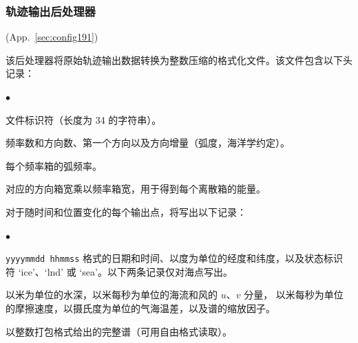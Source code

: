 \vsssub
\subsubsection{轨迹输出后处理器} \label{sec:ww3trck}
\vsssub

 (App.~\ref{sec:config191})

\vspace{\baselineskip}
\noindent
该后处理器将原始轨迹输出数据转换为整数压缩的格式化文件。该文件包含以下头记录：

\begin{list}{$\bullet$}{\itemsep 0mm \parsep 0mm}
\item 文件标识符（长度为 34 的字符串）。
\item 频率数和方向数、第一个方向以及方向增量（弧度，海洋学约定）。
\item 每个频率箱的弧频率。
\item 对应的方向箱宽乘以频率箱宽，用于得到每个离散箱的能量。
\end{list}

\noindent
对于随时间和位置变化的每个输出点，将写出以下记录：
\begin{list}{$\bullet$}{\itemsep 0mm \parsep 0mm}
\item {\tt yyyymmdd hhmmss} 格式的日期和时间、以度为单位的经度和纬度，以及状态标识符
      `{\F ice}'、`{\F lnd}' 或 `{\F sea}'。以下两条记录仅对海点写出。
\item 以米为单位的水深，以米每秒为单位的海流和风的 $u$、$v$ 分量，
      以米每秒为单位的摩擦速度，以摄氏度为单位的气海温差，以及谱的缩放因子。
\item 以整数打包格式给出的完整谱（可用自由格式读取）。
\end{list}

\pb
